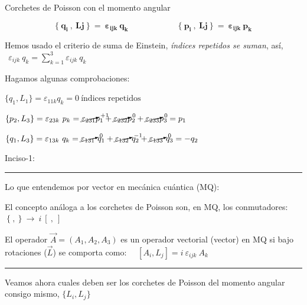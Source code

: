 \vspace{5mm}
\begin{large}
\begin{myalertblock}{Corchetes de Poisson con el momento angular}

\begin{equation}
\label{T22COL}	
\boldsymbol{
\{\ q_i\ , \ Lj\ \} \ = \ \varepsilon_{ijk}\ q_k
\qquad  \qquad \qquad
\{\ p_i\ , \ Lj\ \} \ = \ \varepsilon_{ijk}\ p_k
}
\end{equation}	
\end{myalertblock}
\end{large}

Hemos usado el criterio de suma de Einstein, \emph{índices repetidos se suman}, así,  $\ \ \displaystyle \varepsilon_{ijk}\ q_k = \sum_{k=1}^3  \varepsilon_{ijk}\ q_k $ 

Hagamos algunas comprobaciones:

\hspace{1cm} $\{q_1,L_1\}= \varepsilon_{11k}q_k = 0 \ \text{índices repetidos} $

\hspace{1cm} $\{p_2,L_3\}= \varepsilon_{23k}\ p_k=\cancelto{+1}{\varepsilon_{231}}p_1+\cancelto{0}{\varepsilon_{232}}p_2+\cancelto{0}{\varepsilon_{233}}p_3=p_1$

\hspace{1cm} $\{q_1,L_3\}=\varepsilon_{13k} \ q_k = \cancelto{0}{\varepsilon_{131}} \ q_1  +\cancelto{-1}{\varepsilon_{132}} \ q_2 +\cancelto{0}{\varepsilon_{133}} \ q_3 = -q_2	$

\vspace{5mm}

Inciso-1: $\quad$ \rule{200pt}{0.1pt}

Lo que entendemos por vector en mecánica cuántica (MQ):

El concepto análoga a los corchetes de Poisson son, en MQ, los conmutadores: $\ \{\ , \ \} \ \to \ i\ [\ ,\ ]$

El operador $\overrightarrow A=(A_1,A_2,A_3)$ es un operador vectorial (vector) en MQ si bajo rotaciones ($\overrightarrow L$) se comporta como: $\quad [A_i,L_j]=i\ \varepsilon_{ijk} \ A_k$

\vspace{-1cm}
\begin{flushright}\rule{250pt}{0.1pt}	\end{flushright}


Veamos ahora cuales deben ser los corchetes de Poisson del momento angular consigo mismo, $\{L_i,L_j\}$


